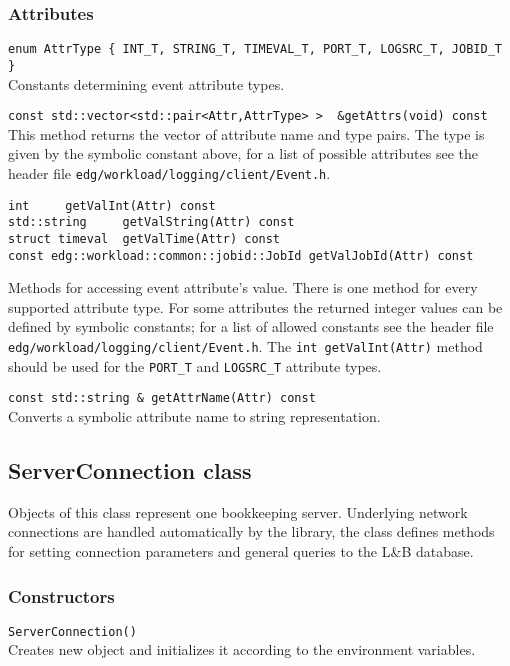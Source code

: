 \documentclass{egee}
\def\LB{L\&B\xspace}
\begin{document}
\subsubsection*{Attributes}
\begin{description}

\item{\verb|enum AttrType { INT_T, STRING_T, TIMEVAL_T, PORT_T, LOGSRC_T, JOBID_T }|}\\
Constants determining event attribute types. 

\item{\verb|const std::vector<std::pair<Attr,AttrType> >  &getAttrs(void) const|}\\
This method returns the vector of attribute name and type pairs. The
type is given by the symbolic constant above, for a list of possible
attributes see the header file {\tt edg/workload/logging/client/Event.h}.

\item{
\begin{verbatim}
int		getValInt(Attr) const
std::string 	getValString(Attr) const
struct timeval	getValTime(Attr) const
const edg::workload::common::jobid::JobId getValJobId(Attr) const
\end{verbatim}
}
Methods for accessing event attribute's value. There is one method for
every supported attribute type. For some attributes the returned
integer values can be defined by symbolic constants; for a list of
allowed constants see the header file
{\tt edg/workload/logging/client/Event.h}. 
The \verb|int getValInt(Attr)| method should be used for 
the \verb|PORT_T| and \verb|LOGSRC_T| attribute types.

\item{\verb|const std::string & getAttrName(Attr) const|}\\
Converts a symbolic attribute name to string representation.

\end{description}

\subsection*{ServerConnection class}
Objects of this class represent one bookkeeping server. Underlying
network connections are handled automatically by the library, the
class defines methods for setting connection parameters and general
queries to the \LB database.

\subsubsection*{Constructors}
\begin{description}
\item{\verb|ServerConnection()|}\\ Creates new object and initializes
it according to the environment variables. 
\end{description}
\end{document}
